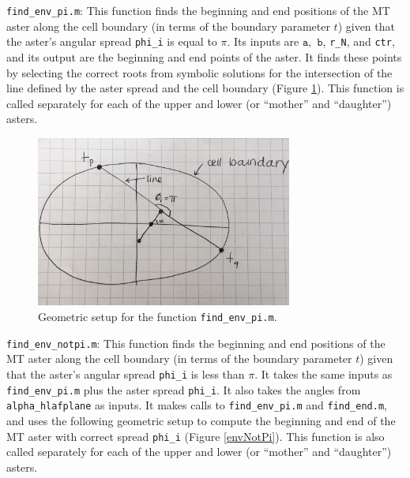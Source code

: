\documentclass{article}
\begin{document}
\noindent\texttt{find\_env\_pi.m}: This function finds the beginning and end positions of the MT aster along the cell boundary (in terms of the boundary parameter $t$) given that the aster's angular spread \texttt{phi\_i} is equal to $\pi$. Its inputs are $\texttt{a},$ $\texttt{b}$, \texttt{r\_N}, and \texttt{ctr}, and its output are the beginning and end points of the aster. It finds these points by selecting the correct roots from symbolic solutions for the intersection of the line defined by the aster spread and the cell boundary (Figure \ref{envPi}). This function is called separately for each of the upper and lower (or ``mother'' and ``daughter'') asters. 

\begin{figure}[H]
\centering
\includegraphics[width=0.75\textwidth]{figures/envPi.jpg}
\caption{Geometric setup for the function \texttt{find\_env\_pi.m}.}
\label{envPi}
\end{figure}

\noindent\texttt{find\_env\_notpi.m}:  This function finds the beginning and end positions of the MT aster along the cell boundary (in terms of the boundary parameter $t$) given that the aster's angular spread \texttt{phi\_i} is less than $\pi$. It takes the same inputs as \texttt{find\_env\_pi.m} plus the aster spread \texttt{phi\_i}. It also takes the angles from \texttt{alpha\_hlafplane} as inputs. It makes calls to \texttt{find\_env\_pi.m} and \texttt{find\_end.m}, and uses the following geometric setup to compute the beginning and end of the MT aster with correct spread \texttt{phi\_i} (Figure \ref{envNotPi}). This function is also called separately for each of the upper and lower (or ``mother'' and ``daughter'') asters. 
\\[3pt]
\end{document}
